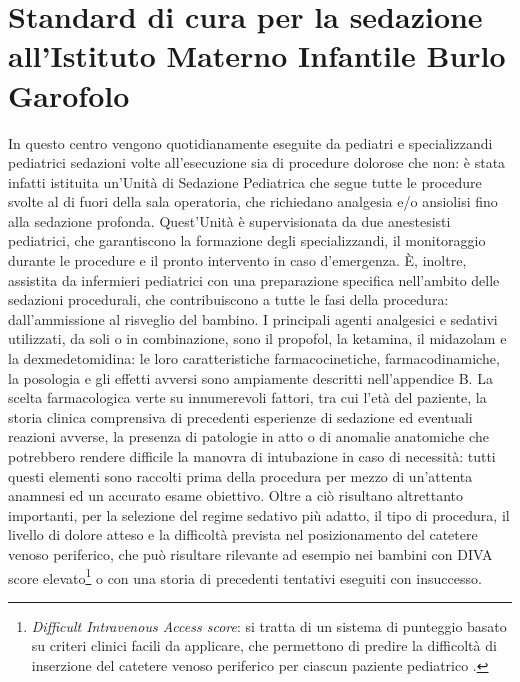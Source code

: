 
\section{Standard di cura per la sedazione all'Istituto Materno Infantile Burlo Garofolo}

In questo centro vengono quotidianamente eseguite da pediatri e specializzandi pediatrici sedazioni volte all'esecuzione sia di procedure dolorose che non: è stata infatti istituita un'Unità di Sedazione Pediatrica che segue tutte le procedure svolte al di fuori della sala operatoria, che richiedano analgesia e/o ansiolisi fino alla sedazione profonda. Quest'Unità è supervisionata da due anestesisti pediatrici, che garantiscono la formazione degli specializzandi, il monitoraggio durante le procedure e il pronto intervento in caso d'emergenza. \`E, inoltre, assistita da infermieri pediatrici con una preparazione specifica nell'ambito delle sedazioni procedurali, che contribuiscono a tutte le fasi della procedura: dall'ammissione al risveglio del bambino. I principali agenti analgesici e sedativi utilizzati, da soli o in combinazione, sono il propofol, la ketamina, il midazolam e la dexmedetomidina: le loro caratteristiche farmacocinetiche, farmacodinamiche, la posologia e gli effetti avversi sono ampiamente descritti nell'appendice B. La scelta farmacologica verte su innumerevoli fattori, tra cui l'età del paziente, la storia clinica comprensiva di precedenti esperienze di sedazione ed eventuali reazioni avverse, la presenza di patologie in atto o di anomalie anatomiche che potrebbero rendere difficile la manovra di intubazione in caso di necessità: tutti questi elementi sono raccolti prima della procedura per mezzo di un'attenta anamnesi ed un accurato esame obiettivo. Oltre a ciò risultano altrettanto importanti, per la selezione del regime sedativo più adatto, il tipo di procedura, il livello di dolore atteso e la difficoltà prevista nel posizionamento del catetere venoso periferico, che può risultare rilevante ad esempio nei bambini con DIVA score elevato\footnote{\emph{Difficult Intravenous Access score}: si tratta di un sistema di punteggio basato su criteri clinici facili da applicare, che permettono di predire la difficoltà di inserzione del catetere venoso periferico per ciascun paziente pediatrico \cite{Yen2008}.} o con una storia di precedenti tentativi eseguiti con insuccesso. 
